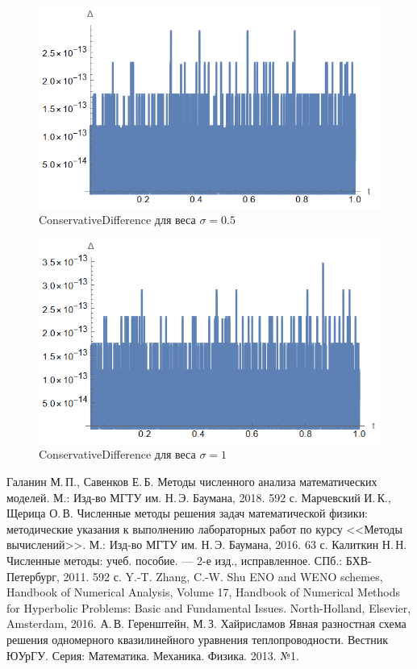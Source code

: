 \documentclass[12pt, a4paper]{article}
\begin{document}
	\begin{figure}[H]
		\centering
		\includegraphics[width=1\textwidth]{conserv2}
		\caption{ConservativeDifference для веса $\sigma = 0.5$}
	\end{figure}

	\begin{figure}[H]
		\centering
		\includegraphics[width=1\textwidth]{conserv3}
		\caption{ConservativeDifference для веса $\sigma = 1$}
	\end{figure}

	\begin{thebibliography}{9}
		 Галанин М.\,П., Савенков Е.\,Б. Методы численного анализа математических моделей. М.: Изд-во МГТУ им. Н.\,Э. Баумана, 2018. 592 с.
		 Марчевский И.\,К., Щерица О.\,В. Численные методы решения задач математической физики: методические указания к выполнению лабораторных работ по курсу <<Методы вычислений>>. М.: Изд-во МГТУ им. Н.\,Э. Баумана, 2016. 63 с.
		 Калиткин Н.\,Н.
		Численные методы: учеб. пособие. —
		2-е изд., исправленное. СПб.: БХВ-Петербург, 2011. 
		592 с. 
		  Y.-T. Zhang, C.-W. Shu ENO and WENO schemes, Handbook of Numerical Analysis, Volume 17, Handbook of Numerical Methods for Hyperbolic Problems: Basic and Fundamental Issues. North-Holland, Elsevier, Amsterdam, 2016.
		 А.\,В. Геренштейн, М.\,З. Хайрисламов Явная разностная схема решения одномерного квазилинейного уравнения теплопроводности. Вестник ЮУрГУ. Серия: Математика. Механика. Физика. 2013. №1.
	\end{thebibliography}
	
\end{document}
